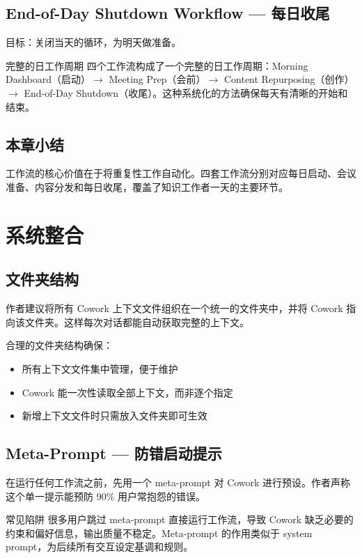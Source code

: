 \documentclass[a4paper]{article}
\begin{document}
\subsection{End-of-Day Shutdown Workflow --- 每日收尾}

目标：关闭当天的循环，为明天做准备。

\begin{importantbox}{完整的日工作周期}
四个工作流构成了一个完整的日工作周期：Morning Dashboard（启动）$\to$ Meeting Prep（会前）$\to$ Content Repurposing（创作）$\to$ End-of-Day Shutdown（收尾）。这种系统化的方法确保每天有清晰的开始和结束。
\end{importantbox}

\subsection{本章小结}

工作流的核心价值在于将重复性工作自动化。四套工作流分别对应每日启动、会议准备、内容分发和每日收尾，覆盖了知识工作者一天的主要环节。

\section{系统整合}

\subsection{文件夹结构}

作者建议将所有 Cowork 上下文文件组织在一个统一的文件夹中，并将 Cowork 指向该文件夹。这样每次对话都能自动获取完整的上下文。

合理的文件夹结构确保：
\begin{itemize}
    \item 所有上下文文件集中管理，便于维护
    \item Cowork 能一次性读取全部上下文，而非逐个指定
    \item 新增上下文文件时只需放入文件夹即可生效
\end{itemize}

\subsection{Meta-Prompt --- 防错启动提示}

在运行任何工作流之前，先用一个 meta-prompt 对 Cowork 进行预设。作者声称这个单一提示能预防 90\% 用户常抱怨的错误。

\begin{warningbox}{常见陷阱}
很多用户跳过 meta-prompt 直接运行工作流，导致 Cowork 缺乏必要的约束和偏好信息，输出质量不稳定。Meta-prompt 的作用类似于 system prompt，为后续所有交互设定基调和规则。
\end{warningbox}
\end{document}
